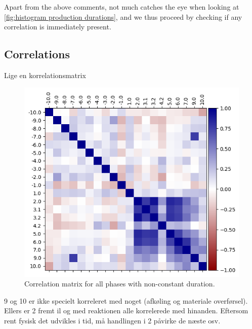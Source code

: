 \documentclass[../Thesis.tex]{subfiles}
\begin{document}
Apart from the above comments, not much catches the eye when looking at \autoref{fig:histogram production durations}, and we thus proceed by checking if any correlation is immediately present.




\subsection{Correlations}

Lige en korrelationsmatrix
\begin{figure}[H]
    \centering
    \includegraphics[width=.9\linewidth]{figures/Multiple cycles data/Correlation matrix production and delays.png}
    \caption{Correlation matrix for all phases with non-constant duration.}
\end{figure}

9 og 10 er ikke specielt korreleret med noget (afkøling og materiale overførsel). Ellers er 2 fremt il og med reaktionen alle korrelerede med hinanden. Eftersom rent fysisk det udvikles i tid, må handlingen i 2 påvirke de næste osv.
\end{document}
